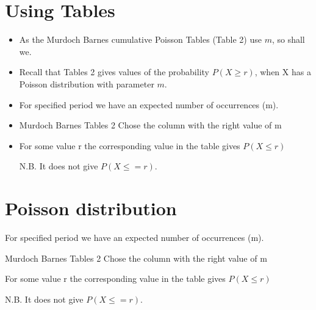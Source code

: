 \documentclass[]{report}
\begin{document}

\section{Using Tables}

\begin{itemize}
\item As the Murdoch Barnes cumulative Poisson Tables (Table 2) use $m$, so shall we. 
\item Recall that Tables 2 gives values of the probability $P(X \geq r )$, when X has a Poisson distribution with
parameter $m$.

\item For specified period we have an expected number of occurrences (m).

\item Murdoch Barnes Tables 2
Chose the column with the right value of m


\item For some value r the corresponding value in the table gives $P(X \leq r)$

N.B. It does not give $P(X \leq = r)$.
\end{itemize}







\section{Poisson distribution}
For specified period we have an expected number of occurrences (m).

Murdoch Barnes Tables 2
Chose the column with the right value of m


For some value r the corresponding value in the table gives $P(X \leq r)$

N.B. It does not give $P(X \leq = r)$.
\end{document}
